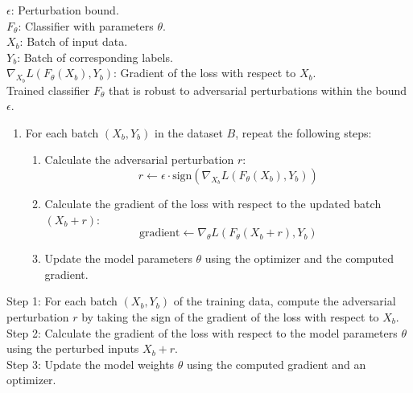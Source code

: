 $ \epsilon $: Perturbation bound. \\
$ F_\theta $: Classifier with parameters $ \theta $. \\
$ X_b $: Batch of input data. \\
$ Y_b $: Batch of corresponding labels. \\
$ \nabla_{X_b} L(F_\theta(X_b), Y_b) $: Gradient of the loss with respect to $ X_b $. \\

Trained classifier $ F_\theta $ that is robust to adversarial perturbations within the bound $ \epsilon $. \\

\begin{enumerate}
        \item For each batch $(X_b, Y_b)$ in the dataset $B$, repeat the following steps:
        \begin{enumerate}
            \item Calculate the adversarial perturbation $r$:
            \[
            r \leftarrow \epsilon \cdot \text{sign}\left( \nabla_{X_b} L(F_\theta(X_b), Y_b) \right)
            \]
            \item Calculate the gradient of the loss with respect to the updated batch $(X_b + r)$:
            \[
            \text{gradient} \leftarrow \nabla_{\theta} L(F_\theta(X_b + r), Y_b)
            \]
            \item Update the model parameters $\theta$ using the optimizer and the computed gradient.
        \end{enumerate}
    \end{enumerate}

Step 1: For each batch $ (X_b, Y_b) $ of the training data, compute the adversarial perturbation $ r $ by taking the sign of the gradient of the loss with respect to $ X_b $. \\
Step 2: Calculate the gradient of the loss with respect to the model parameters $ \theta $ using the perturbed inputs $ X_b + r $. \\
Step 3: Update the model weights $ \theta $ using the computed gradient and an optimizer. \\
